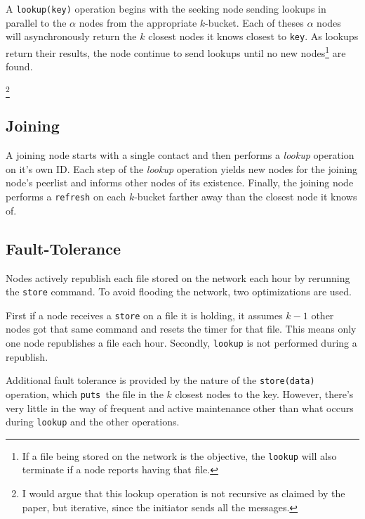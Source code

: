 \documentclass[10pt,letterpaper,twoside]{report}
\begin{document}
A \texttt{lookup(key)} operation begins with the seeking node sending lookups in parallel to the $\alpha$ nodes from the appropriate $k$-bucket.
Each of theses $\alpha$ nodes will asynchronously return the $k$ closest nodes it knows closest to \texttt{key}.
As lookups return their results, the node continue to send lookups until no new nodes\footnote{If a file being stored on the network is the objective, the \texttt{lookup} will also terminate if a node reports having that file.} are found.  

\footnote{I would argue that this lookup operation is not recursive as claimed by the paper, but iterative, since the initiator sends all the messages.}

\subsection*{Joining}
A joining node starts with a single contact and then performs a \textit{lookup} operation on it's own ID.
Each step of the \textit{lookup} operation yields new nodes for the joining node's peerlist and informs other nodes of its existence.
Finally, the joining node performs a \texttt{refresh} on each $k$-bucket farther away than the closest node it knows of.




\subsection*{Fault-Tolerance}
Nodes actively republish each file stored on the network each hour by rerunning the \texttt{store} command.  
To avoid flooding the network, two optimizations are used.

First if a node receives a \texttt{store} on a file it is holding, it assumes $k-1$ other nodes got that same command and resets the timer for that file.
This means only one node republishes a file each hour.
Secondly, \texttt{lookup} is not performed during a republish.


Additional fault tolerance is provided by the nature of the \texttt{store(data)} operation, which \texttt{puts }the file in the $k$ closest nodes to the key.
However, there's very little in the way of frequent and active maintenance other than what occurs during \texttt{lookup} and the other operations.


\end{document}

